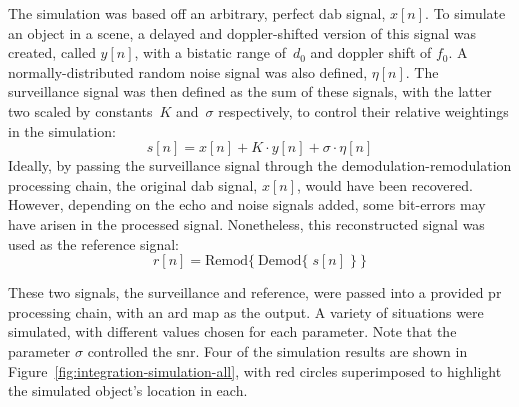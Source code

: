 \documentclass[class=report,11pt,crop=false]{standalone}
\begin{document}
The simulation was based off an arbitrary, perfect \gls{dab} signal, \(x[n]\). To simulate an object in a scene, a delayed and doppler-shifted version of this signal was created, called \(y[n]\), with a bistatic range of~\(d_0\) and doppler shift of \(f_0\). A normally-distributed random noise signal was also defined, \(\eta[n]\). The surveillance signal was then defined as the sum of these signals, with the latter two scaled by constants~\(K\) and~\(\sigma\) respectively, to control their relative weightings in the simulation:
\begin{equation}
    s[n] = x[n] + K \cdot y[n] + \sigma \cdot \eta[n]
\end{equation}
Ideally, by passing the surveillance signal through the demodulation-remodulation processing chain, the original \gls{dab} signal, \(x[n]\), would have been recovered. However, depending on the echo and noise signals added, some bit-errors may have arisen in the processed signal. Nonetheless, this reconstructed signal was used as the reference signal:
\begin{equation}
    r[n] = \mathrm{Remod}\bigg\{\:\mathrm{Demod}\Big\{\; s[n]\;\Big\}\:\bigg\}
\end{equation}

These two signals, the surveillance and reference, were passed into a provided \gls{pr} processing chain, with an \gls{ard} map as the output. A variety of situations were simulated, with different values chosen for each parameter. Note that the parameter \(\sigma\) controlled the \gls{snr}. Four of the simulation results are shown in Figure~\ref{fig:integration-simulation-all}, with red circles superimposed to highlight the simulated object's location in each.
\end{document}
